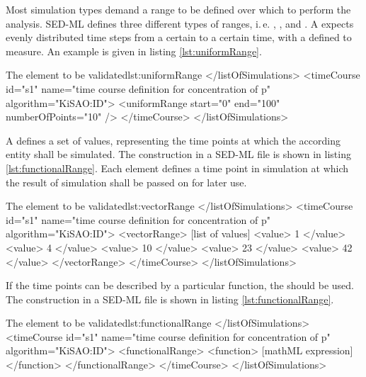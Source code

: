 \label{sec:range}
Most simulation types demand a range to be defined over which to perform the analysis. SED-ML defines three different types of ranges, i.\,e. , , and .
A  expects evenly distributed time steps from a certain  to a certain  time, with a defined  to measure. An example is given in listing \ref{lst:uniformRange}. %
\begin{myXmlLst}{The  element \alert{to be validated}}{lst:uniformRange}
</listOfSimulations>
 <timeCourse id="s1" name="time course definition for concentration of p" algorithm="KiSAO:ID">
  <uniformRange start="0" end="100" numberOfPoints="10" />
 </timeCourse>
</listOfSimulations>
\end{myXmlLst}


A  defines a set of values, representing the time points at which the according entity shall be simulated. %
The construction in a SED-ML file is shown in listing \ref{lst:functionalRange}. Each  element defines a time point in simulation at which the result of simulation shall be passed on for later use.
%
\begin{myXmlLst}{The  element \alert{to be validated}}{lst:vectorRange}
</listOfSimulations>
 <timeCourse id="s1" name="time course definition for concentration of p" algorithm="KiSAO:ID">
  <vectorRange>
   [list of values]
   <value> 1  </value>
   <value> 4  </value>  
   <value> 10 </value>
   <value> 23 </value>
   <value> 42 </value>
  </vectorRange>
 </timeCourse>
</listOfSimulations>
\end{myXmlLst}

If the time points can be described by a particular function, the  should be used. The construction in a SED-ML file is shown in listing \ref{lst:functionalRange}.
\begin{myXmlLst}{The  element \alert{to be validated}}{lst:functionalRange}
</listOfSimulations>
 <timeCourse id="s1" name="time course definition for concentration of p" algorithm="KiSAO:ID">
  <functionalRange>
   <function>
    [mathML expression]
   </function>
  </functionalRange>
 </timeCourse>
</listOfSimulations>
\end{myXmlLst}


